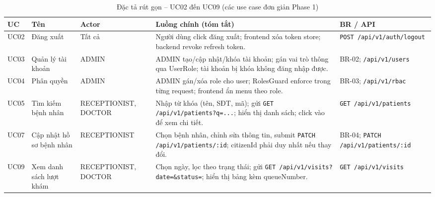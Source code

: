 \begin{table}[H]
\centering
\caption{Đặc tả rút gọn -- UC02 đến UC09 (các use case đơn giản Phase 1)}
\label{tab:uc-simple-p1a}
\begin{tabularx}{\textwidth}{|p{1.3cm}|p{2.5cm}|p{2.0cm}|X|p{2.3cm}|}
\hline
\textbf{UC} & \textbf{Tên} & \textbf{Actor} & \textbf{Luồng chính (tóm tắt)} & \textbf{BR / API} \\
\hline
UC02 & Đăng xuất & Tất cả & Người dùng click đăng xuất; frontend xóa token store; backend revoke refresh token. & \texttt{POST /api/v1/auth/logout} \\
\hline
UC03 & Quản lý tài khoản & ADMIN & ADMIN tạo/cập nhật/khóa tài khoản; gán vai trò thông qua UserRole; tài khoản bị khóa không đăng nhập được. & BR-02; \texttt{/api/v1/users} \\
\hline
UC04 & Phân quyền & ADMIN & ADMIN gán/xóa role cho user; RolesGuard enforce trong từng request; frontend ẩn menu theo role. & BR-03; \texttt{/api/v1/rbac} \\
\hline
UC05 & Tìm kiếm bệnh nhân & RECEPTIONIST, DOCTOR & Nhập từ khóa (tên, SĐT, mã); gửi \texttt{GET /api/v1/patients?q=...}; hiển thị danh sách; click vào để xem chi tiết. & \texttt{GET /api/v1/patients} \\
\hline
UC07 & Cập nhật hồ sơ bệnh nhân & RECEPTIONIST & Chọn bệnh nhân, chỉnh sửa thông tin, submit \texttt{PATCH /api/v1/patients/:id}; citizenId phải duy nhất nếu thay đổi. & BR-04; \texttt{PATCH /api/v1/patients/:id} \\
\hline
UC09 & Xem danh sách lượt khám & RECEPTIONIST, DOCTOR & Chọn ngày, lọc theo trạng thái; gửi \texttt{GET /api/v1/visits?date=\&status=}; hiển thị bảng kèm queueNumber. & \texttt{GET /api/v1/visits} \\
\hline
\end{tabularx}
\end{table}


